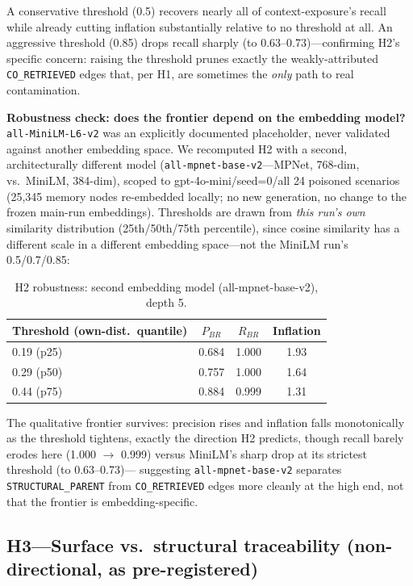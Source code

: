 A conservative threshold (0.5) recovers nearly all of context-exposure's
recall while already cutting inflation substantially relative to no
threshold at all. An aggressive threshold (0.85) drops recall sharply
(to 0.63--0.73)---confirming H2's specific concern: raising the
threshold prunes exactly the weakly-attributed \texttt{CO\_RETRIEVED}
edges that, per H1, are sometimes the \emph{only} path to real
contamination.

\textbf{Robustness check: does the frontier depend on the embedding
model?} \texttt{all-MiniLM-L6-v2} was an explicitly documented
placeholder, never validated against another embedding space. We
recomputed H2 with a second, architecturally different model
(\texttt{all-mpnet-base-v2}---MPNet, 768-dim, vs.\ MiniLM, 384-dim),
scoped to gpt-4o-mini/seed=0/all 24 poisoned scenarios (25{,}345
memory nodes re-embedded locally; no new generation, no change to the
frozen main-run embeddings). Thresholds are drawn from \emph{this
run's own} similarity distribution (25th/50th/75th percentile), since
cosine similarity has a different scale in a different embedding
space---not the MiniLM run's 0.5/0.7/0.85:

\begin{table}[h]
\centering
\caption{H2 robustness: second embedding model (all-mpnet-base-v2), depth 5.}
\label{tab:h2-second-embedding}
\begin{tabular}{lccc}
\toprule
Threshold (own-dist.\ quantile) & $P_{BR}$ & $R_{BR}$ & Inflation \\
\midrule
0.19 (p25) & 0.684 & 1.000 & 1.93 \\
0.29 (p50) & 0.757 & 1.000 & 1.64 \\
0.44 (p75) & 0.884 & 0.999 & 1.31 \\
\bottomrule
\end{tabular}
\end{table}

The qualitative frontier survives: precision rises and inflation falls
monotonically as the threshold tightens, exactly the direction H2
predicts, though recall barely erodes here (1.000 $\to$ 0.999) versus
MiniLM's sharp drop at its strictest threshold (to 0.63--0.73)---
suggesting \texttt{all-mpnet-base-v2} separates
\texttt{STRUCTURAL\_PARENT} from \texttt{CO\_RETRIEVED} edges more
cleanly at the high end, not that the frontier is embedding-specific.

\subsection{H3---Surface vs.\ structural traceability (non-directional, as pre-registered)}

